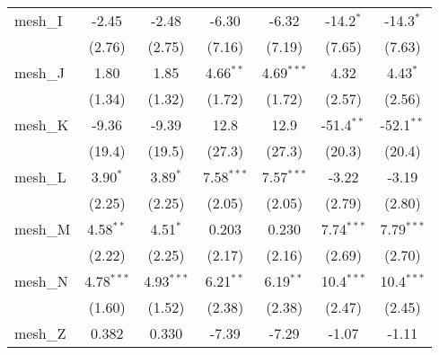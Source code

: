 \begin{tabular}{lcccccc}
   mesh\_I                                                     & -2.45          & -2.48          & -6.30         & -6.32         & -14.2$^{*}$   & -14.3$^{*}$\\   
                                                               & (2.76)         & (2.75)         & (7.16)        & (7.19)        & (7.65)        & (7.63)\\   
   mesh\_J                                                     & 1.80           & 1.85           & 4.66$^{**}$   & 4.69$^{***}$  & 4.32          & 4.43$^{*}$\\   
                                                               & (1.34)         & (1.32)         & (1.72)        & (1.72)        & (2.57)        & (2.56)\\   
   mesh\_K                                                     & -9.36          & -9.39          & 12.8          & 12.9          & -51.4$^{**}$  & -52.1$^{**}$\\   
                                                               & (19.4)         & (19.5)         & (27.3)        & (27.3)        & (20.3)        & (20.4)\\   
   mesh\_L                                                     & 3.90$^{*}$     & 3.89$^{*}$     & 7.58$^{***}$  & 7.57$^{***}$  & -3.22         & -3.19\\   
                                                               & (2.25)         & (2.25)         & (2.05)        & (2.05)        & (2.79)        & (2.80)\\   
   mesh\_M                                                     & 4.58$^{**}$    & 4.51$^{*}$     & 0.203         & 0.230         & 7.74$^{***}$  & 7.79$^{***}$\\   
                                                               & (2.22)         & (2.25)         & (2.17)        & (2.16)        & (2.69)        & (2.70)\\   
   mesh\_N                                                     & 4.78$^{***}$   & 4.93$^{***}$   & 6.21$^{**}$   & 6.19$^{**}$   & 10.4$^{***}$  & 10.4$^{***}$\\   
                                                               & (1.60)         & (1.52)         & (2.38)        & (2.38)        & (2.47)        & (2.45)\\   
   mesh\_Z                                                     & 0.382          & 0.330          & -7.39         & -7.29         & -1.07         & -1.11\\   

\end{tabular}
